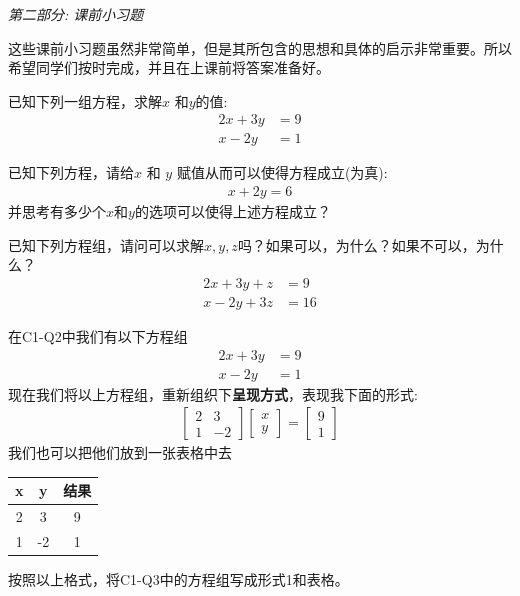 \documentclass[12pt]{article}
\numberwithin{figure}{section}
\numberwithin{equation}{section}
\newenvironment{question}[2][Question]{\begin{trivlist}
\item[\hskip \labelsep {\bfseries #1}\hskip \labelsep {\bfseries #2.}]}{\end{trivlist}}
\begin{document}
\noindent
\textit{第二部分: 课前小习题}

这些课前小习题虽然非常简单，但是其所包含的思想和具体的启示非常重要。所以希望同学们按时完成，并且在上课前将答案准备好。


\begin{question}{C1-Q1}
已知下列一组方程，求解$x$ 和$y$的值: 
\begin{align*}
	2x + 3y & = 9 \\
	x -2y & = 1
\end{align*}	
\end{question}


\begin{question}{C1-Q2}
	已知下列方程，请给$x$ 和 $y$ 赋值从而可以使得方程成立(为真):
	\begin{align*}
		x + 2y = 6 
	\end{align*}
	并思考有多少个$x$和$y$的选项可以使得上述方程成立？
\end{question}



\begin{question}{C1-Q3}
	已知下列方程组，请问可以求解$x, y, z$吗？如果可以，为什么？如果不可以，为什么？
	\begin{align*}
		2x + 3y + z & =9 \\
		x - 2y + 3z & = 16
	\end{align*}
\end{question}

\noindent



\begin{question}{C1-Q4}
在C1-Q2中我们有以下方程组
\begin{align*}
	2x + 3y & = 9 \\
	x -2y & = 1
\end{align*}	
现在我们将以上方程组，重新组织下\textbf{呈现方式}，表现我下面的形式:
\begin{align*}
	\begin{bmatrix}
	2 & 3 \\
	1 & -2 
\end{bmatrix} \begin{bmatrix}
	x \\
	y 
\end{bmatrix} = \begin{bmatrix}
	9 \\
	1 
\end{bmatrix} \tag{形式1}
\end{align*}
我们也可以把他们放到一张表格中去
\begin{table}[H]
	\centering
	\begin{tabular}{|c|c|c|}
	\hline 
		x & y & 结果 \\
		\hline 
		2 & 3 & 9 \\
		1 & -2 & 1 \\
		\hline 
	\end{tabular}
\end{table}
按照以上格式，将C1-Q3中的方程组写成形式1和表格。
\end{question}
\end{document}
